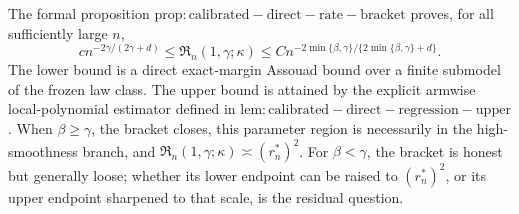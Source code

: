 The formal proposition \(\mathrm{prop:calibrated-direct-rate-bracket}\) proves, for all sufficiently large \(n\),
\[
 c n^{-2\gamma/(2\gamma+d)}
 \le \mathfrak R_n(1,\gamma;\kappa)
 \le C n^{-2\min\{\beta,\gamma\}/\{2\min\{\beta,\gamma\}+d\}}.
\]
The lower bound is a direct exact-margin Assouad bound over a finite submodel of the frozen law class. The upper bound is attained by the explicit armwise local-polynomial estimator defined in \(\mathrm{lem:calibrated-direct-regression-upper}\). When \(\beta\ge\gamma\), the bracket closes, this parameter region is necessarily in the high-smoothness branch, and \(\mathfrak R_n(1,\gamma;\kappa)\asymp(r_n^*)^2\). For \(\beta<\gamma\), the bracket is honest but generally loose; whether its lower endpoint can be raised to \((r_n^*)^2\), or its upper endpoint sharpened to that scale, is the residual question.